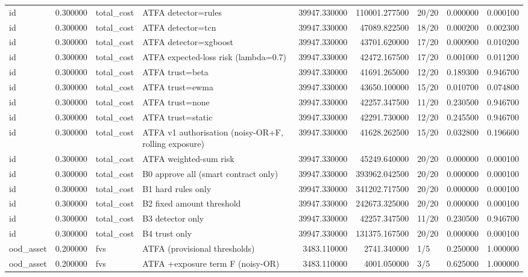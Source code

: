 \begin{tabular}{lrllrrlrr}
id & 0.300000 & total\_cost & ATFA detector=rules & 39947.330000 & 110001.277500 & 20/20 & 0.000000 & 0.000100 \\
id & 0.300000 & total\_cost & ATFA detector=tcn & 39947.330000 & 47089.822500 & 18/20 & 0.000200 & 0.002300 \\
id & 0.300000 & total\_cost & ATFA detector=xgboost & 39947.330000 & 43701.620000 & 17/20 & 0.000900 & 0.010200 \\
id & 0.300000 & total\_cost & ATFA expected-loss risk (lambda=0.7) & 39947.330000 & 42472.167500 & 17/20 & 0.001000 & 0.011200 \\
id & 0.300000 & total\_cost & ATFA trust=beta & 39947.330000 & 41691.265000 & 12/20 & 0.189300 & 0.946700 \\
id & 0.300000 & total\_cost & ATFA trust=ewma & 39947.330000 & 43650.100000 & 15/20 & 0.010700 & 0.074800 \\
id & 0.300000 & total\_cost & ATFA trust=none & 39947.330000 & 42257.347500 & 11/20 & 0.230500 & 0.946700 \\
id & 0.300000 & total\_cost & ATFA trust=static & 39947.330000 & 42291.730000 & 12/20 & 0.245500 & 0.946700 \\
id & 0.300000 & total\_cost & ATFA v1 authorisation (noisy-OR+F, rolling exposure) & 39947.330000 & 41628.262500 & 15/20 & 0.032800 & 0.196600 \\
id & 0.300000 & total\_cost & ATFA weighted-sum risk & 39947.330000 & 45249.640000 & 20/20 & 0.000000 & 0.000100 \\
id & 0.300000 & total\_cost & B0 approve all (smart contract only) & 39947.330000 & 393962.042500 & 20/20 & 0.000000 & 0.000100 \\
id & 0.300000 & total\_cost & B1 hard rules only & 39947.330000 & 341202.717500 & 20/20 & 0.000000 & 0.000100 \\
id & 0.300000 & total\_cost & B2 fixed amount threshold & 39947.330000 & 242673.325000 & 20/20 & 0.000000 & 0.000100 \\
id & 0.300000 & total\_cost & B3 detector only & 39947.330000 & 42257.347500 & 11/20 & 0.230500 & 0.946700 \\
id & 0.300000 & total\_cost & B4 trust only & 39947.330000 & 131375.167500 & 20/20 & 0.000000 & 0.000100 \\
ood\_asset & 0.200000 & fvs & ATFA (provisional thresholds) & 3483.110000 & 2741.340000 & 1/5 & 0.250000 & 1.000000 \\
ood\_asset & 0.200000 & fvs & ATFA +exposure term F (noisy-OR) & 3483.110000 & 4001.050000 & 3/5 & 0.625000 & 1.000000 \\

\end{tabular}
